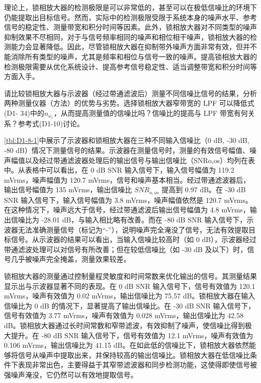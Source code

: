 理论上，锁相放大器的检测极限是可以非常低的，甚至可以在极低信噪比的环境下仍能提取出目标信号。然而，实际中的检测极限受限于系统本身的噪声水平、参考信号的稳定性、测量带宽和积分时间等因素。此外，锁相放大器对不同类型的噪声抑制效果不尽相同，对于与信号频率相同的噪声和相位相干噪声，锁相放大器的检测能力会显著降低。因此，尽管锁相放大器在抑制带外噪声方面非常有效，但并不能消除所有类型的噪声，尤其是频率和相位与信号一致的噪声。提高锁相放大器的检测极限需要从优化系统设计、提高参考信号稳定性、适当调整带宽和积分时间等方面入手。

\begin{question}
	请比较锁相放大器与示波器（经过带通滤波后）测量不同信噪比信号的结果，分析两种测量仪器（方法）的优势与劣势。选择锁相放大器窄带宽的 LPF 可以降低式(D1- 34)中的$n_{\omega_r}$，从而提高测量值的信噪比吗？信噪比的提高与 LPF 带宽有何关系？参考式(D1-10)讨论。
\end{question}
\cref{tbl:D1-8-1}中展示了示波器和锁相放大器在三种不同输入信噪比（0 dB, -30 dB, -80 dB）情况下测量信号的结果。示波器在测量信号时，测量的有效信号幅值、噪声幅值以及经过带通滤波器处理后的输出信号与输出信噪比（SNRo,os）均列在表中。从表格中可以看出，在 0 dB SNR 输入信号下，输入信号幅值为 119.2 mVrms，噪声幅值为 120.7 mVrms，信号和噪声基本相当。经过带通滤波器后，输出信号幅值为 135 mVrms，输出信噪比 \( SNR_{o,os} \) 提高到 0.97 dB。在 -30 dB SNR 输入信号下，输入信号幅值为 3.8 mVrms，噪声幅值依然是 120.7 mVrms。在这种情况下，噪声远大于信号，经过带通滤波后输出信号幅值为 4.8 mVrms，输出信噪比为 -28.01 dB，与输入相比略有改善。而在 -80 dB SNR 输入信号下，示波器无法准确测量信号（标记为“-”），说明噪声完全淹没了信号，无法有效提取目标信号。从示波器的结果可以看出，当输入信噪比较高时（如 0 dB），示波器经过带通滤波处理可以对信号有所改善；但在较低信噪比（如 -30 dB 及以下）时，信号几乎被噪声完全掩盖，测量效果较差。

锁相放大器的测量通过控制量程灵敏度和时间常数来优化输出的信号。其测量结果显示出与示波器显著不同的表现。在 0 dB SNR 输入信号下，信号有效值为 120.1 mVrms，噪声有效值为 0.02 mVrms，输出信噪比为 75.57 dB。锁相放大器在输入信噪比为 0 dB 的情况下，显著提高了输出信噪比。在 -30 dB SNR 输入信号下，信号有效值为 3.77 mVrms，噪声有效值为 0.028 mVrms，输出信噪比为 42.58 dB。锁相放大器通过长时间常数和窄带滤波，有效抑制了噪声，使信噪比得到极大提升。在 -80 dB SNR 输入信号下，信号有效值为 12.1 mVrms，噪声有效值为 0.106 mVrms，输出信噪比为 41.15 dB。在如此低的信噪比下，锁相放大器依然能够将信号从噪声中提取出来，并保持较高的输出信噪比。锁相放大器在低信噪比条件下表现非常出色，主要得益于其窄带滤波器和同步检测功能，这使得即使信号被强噪声淹没，它仍然可以有效地提取信号。

